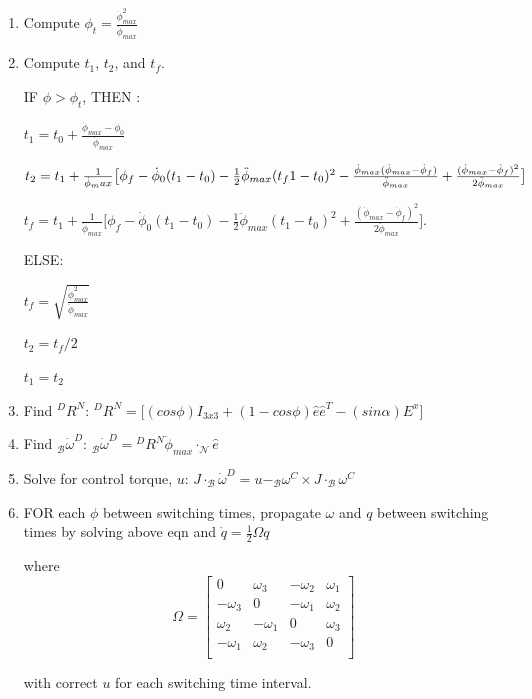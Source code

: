 \documentclass[letterpaper, preprint, paper,11pt]{AAS}	%
\begin{document}
\begin{enumerate}
		\begin{enumerate}
			
			\item Compute $\phi_{t} = \frac{\dot{\phi}_{max}^2}{\ddot{\phi}_{max}}$
			
			\item Compute $t_1$, $t_2$, and $t_f$. 
			
			IF $\phi > \phi_{t}$, THEN : 
			
			$
			t_1 = t_0 + \frac{\dot{\phi}_{max} - \dot{\phi}_0}{\ddot{\phi}_{max}}
			$ 
			
			$
			t_2 = t_1 + \frac{1}{\dot{\phi}_max} \big[ \phi_f - \dot{\phi}_0 (t_1 - t_0) - \frac{1}{2} \ddot{\phi}_{max} (t_f1 - t_0)^2 - \\ \frac{\dot{\phi}_{max} ( \dot{\phi}_{max} -  \dot{\phi}_f ) }{\ddot{\phi}_{max}} + \frac{ (\dot{\phi}_{max} - \dot{\phi}_f)^2}{2 \ddot{\phi}_{max}} \big]
			$
			
			$
			t_f=t_1+\frac{1}{\dot{\phi}_{max}}\Big[ \phi_f-\dot{\phi}_0(t_1-t_0)-\frac{1}{2}\ddot{\phi}_{max}(t_1-t_0)^2+\frac{(\dot{\phi}_{max}-\dot{\phi}_f)^2}{2\ddot{\phi}_{max}} \Big].
			$
			
			ELSE: 
			
			$ t_f = \sqrt{\frac{\dot{\phi}_{max}^2}{\ddot{\phi}_{max}}}
			$
			
			$ t_2 = t_f / 2 $ 
			
			$ t_1 = t_2 $ 
			
			\item Find ${}^DR^N$: 
			$
			{}^DR^N = \big[(cos\phi)I_{3x3} + (1 - cos\phi)\hat{e}\hat{e}^T - (sin\alpha)E^x \big]
			$
			
			\item Find $_\mathcal{B}\dot{\omega}^{D}$: 
			$
			_\mathcal{B}\dot{\omega}^{D} = {}^DR^N \ddot{\phi}_{max} \cdot _\mathcal{N}\hat{e}
			$
			
			\item Solve for control torque, $u$: 
			$
			J \cdot _\mathcal{B}\dot{\omega}^D = u - _\mathcal{B}\omega^C \times J \cdot _\mathcal{B}\omega^C 
			$
			
			\item FOR each $\phi$ between switching times, propagate $\omega$ and $q$ between switching times by solving above eqn and 
			$
			\dot{q} = \frac{1}{2} \Omega q 
			$
			
			where
			\[ \Omega = \left[ \begin{array}{cccc}
			0 & \omega_3 & -\omega_2 & \omega_1 \\
			-\omega_3 & 0 & -\omega_1 & \omega_2 \\
			\omega_2 & -\omega_1 & 0 & \omega_3 \\ 
			-\omega_1 & \omega_2 & -\omega_3 & 0 \\ 
			\end{array} \right] \] 
			
			with correct $u$ for each switching time interval. 
			
		\end{enumerate} 
	\end{enumerate}
	
\end{document}
